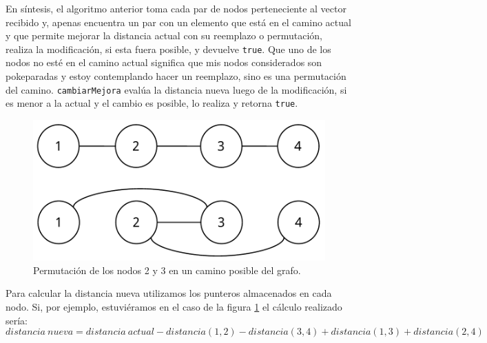 En s\'intesis, el algoritmo anterior toma cada par de nodos perteneciente al vector recibido y, apenas encuentra un par con un elemento que est\'a en el camino actual y que permite mejorar la distancia actual con su reemplazo o permutaci\'on, realiza la modificaci\'on, si esta fuera posible, y devuelve \texttt{true}. Que uno de los nodos no est\'e en el camino actual significa que mis nodos considerados son pokeparadas y estoy contemplando hacer un reemplazo, sino es una permutaci\'on del camino. \texttt{cambiarMejora} eval\'ua la distancia nueva luego de la modificaci\'on, si es menor a la actual y el cambio es posible, lo realiza y retorna \texttt{true}.

\begin{figure}[H]
  \begin{center}
    \includegraphics[scale = 0.5]{imagenes/ej3_algoritmo_1.pdf}
    \caption{Permutaci\'on de los nodos 2 y 3 en un camino posible del grafo.}
    \label{fig:ej3_algoritmo_1}
  \end{center}
\end{figure}

Para calcular la distancia nueva utilizamos los punteros almacenados en cada nodo. Si, por ejemplo, estuvi\'eramos en el caso de la figura \ref{fig:ej3_algoritmo_1} el c\'alculo realizado ser\'ia:
\begin{equation*}
distancia\ nueva = distancia\ actual - distancia(1,2) - distancia(3,4) + distancia(1,3) + distancia(2,4)
\end{equation*}

